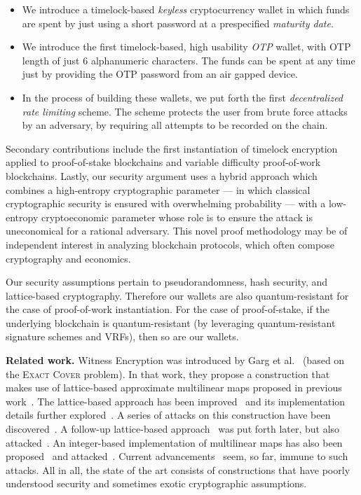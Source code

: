 \begin{itemize}
  \item We introduce a timelock-based \emph{keyless} cryptocurrency wallet in which funds are spent by
        just using a short password at a prespecified \emph{maturity date}.
  \item We introduce the first timelock-based, high usability \emph{OTP} wallet, with OTP length of
        just 6 alphanumeric characters. The funds can be spent at any time just by
        providing the OTP password from an air gapped device.
  \item In the process of building these wallets, we put forth the first
        \emph{decentralized rate limiting} scheme. The scheme protects the user
        from brute force attacks by an adversary, by requiring all attempts to
        be recorded on the chain.
\end{itemize}

Secondary contributions include the first instantiation of timelock encryption applied
to proof-of-stake blockchains and variable difficulty proof-of-work blockchains. Lastly,
our security argument uses a hybrid approach which combines a high-entropy
cryptographic parameter --- in which classical cryptographic security is ensured with overwhelming
probability --- with a low-entropy cryptoeconomic parameter whose role is to ensure the
attack is uneconomical for a rational adversary. This novel proof methodology may be of
independent interest in analyzing blockchain protocols, which often compose cryptography
and economics.

Our security assumptions pertain to pseudorandomness, hash security, and lattice-based cryptography.
Therefore our wallets are also quantum-resistant for the case of proof-of-work instantiation. For the
case of proof-of-stake, if the underlying blockchain is quantum-resistant (by leveraging quantum-resistant
signature schemes and VRFs), then so are our wallets.

\noindent
\textbf{Related work.}
Witness Encryption was introduced by Garg et al.~\cite{STOC:GGSW13} (based on the \textsc{Exact
Cover} problem). In that
work, they propose a construction that makes use of lattice-based approximate multilinear
maps proposed in previous work~\cite{EC:GarGenHal13}. The lattice-based approach has been
improved~\cite{EC:LanSteSte14} and its implementation details further explored~\cite{AC:ACLL15}.
A series of attacks on this construction have been discovered~\cite{EC:CHLRS15,EC:HuJia16,PKC:CLLT17,C:CGHLMM15,C:AlbBaiDuc16,EPRINT:CheJeoLee16}.
A follow-up lattice-based approach~\cite{TCC:GenGorHal15} was put forth later, but also attacked~\cite{C:CLLT16}.
An integer-based implementation of multilinear maps has also been proposed~\cite{C:CorLepTib13,C:CorLepTib15} and
attacked~\cite{EC:CHLRS15,EPRINT:MinFou15,EPRINT:CheLeeRyu15}.
Current advancements~\cite{ma2018mmap} seem, so far, immune to such attacks.
All in all, the state of the art consists of constructions that have poorly
understood security and sometimes exotic cryptographic assumptions.

